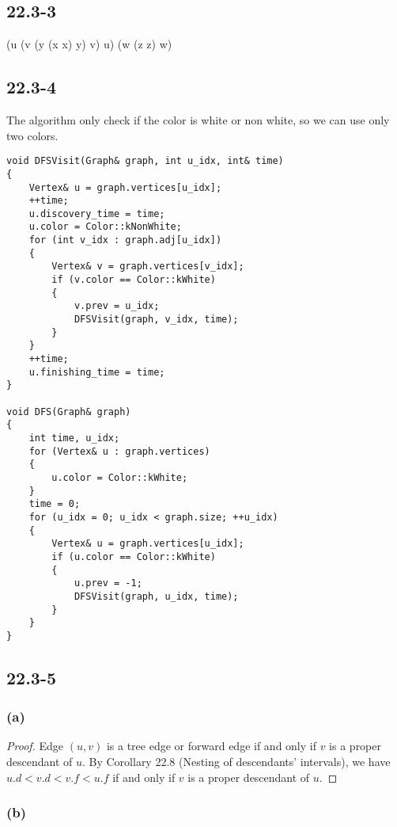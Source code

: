 \subsection*{22.3-3}

(u (v (y (x x) y) v) u) (w (z z) w)

\subsection*{22.3-4}

The algorithm only check if the color is white or non white, 
so we can use only two colors.

\begin{verbatim}
void DFSVisit(Graph& graph, int u_idx, int& time)
{
    Vertex& u = graph.vertices[u_idx];
    ++time;
    u.discovery_time = time;
    u.color = Color::kNonWhite;
    for (int v_idx : graph.adj[u_idx])
    {
        Vertex& v = graph.vertices[v_idx];
        if (v.color == Color::kWhite)
        {
            v.prev = u_idx;
            DFSVisit(graph, v_idx, time);
        }
    }
    ++time;
    u.finishing_time = time;
}

void DFS(Graph& graph)
{
    int time, u_idx;
    for (Vertex& u : graph.vertices)
    {
        u.color = Color::kWhite;
    }
    time = 0;
    for (u_idx = 0; u_idx < graph.size; ++u_idx)
    {
        Vertex& u = graph.vertices[u_idx];
        if (u.color == Color::kWhite)
        {
            u.prev = -1;
            DFSVisit(graph, u_idx, time);
        }
    }
}
\end{verbatim}

\subsection*{22.3-5}

\subsubsection*{(a)}

\begin{proof}
    Edge $(u,v)$ is a tree edge or forward edge if and only if
    $v$ is a proper descendant of $u$.
    By Corollary 22.8 (Nesting of descendants' intervals),
    we have $u.d < v.d < v.f < u.f$ if and only if
    $v$ is a proper descendant of $u$.
\end{proof}

\subsubsection*{(b)}

